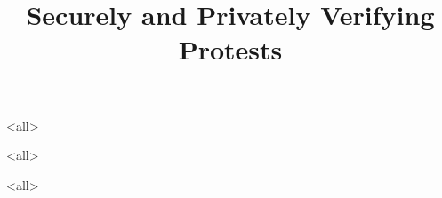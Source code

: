 \title{%
  Securely and Privately Verifying Protests
}

\maketitle

\mode*

\begin{abstract}
  
\end{abstract}

\clearpage
\tableofcontents
\clearpage

\mode<all>


\mode<all>



\mode<all>




\begin{frame}[allowframebreaks]
  \printbibliography{}
\end{frame}
